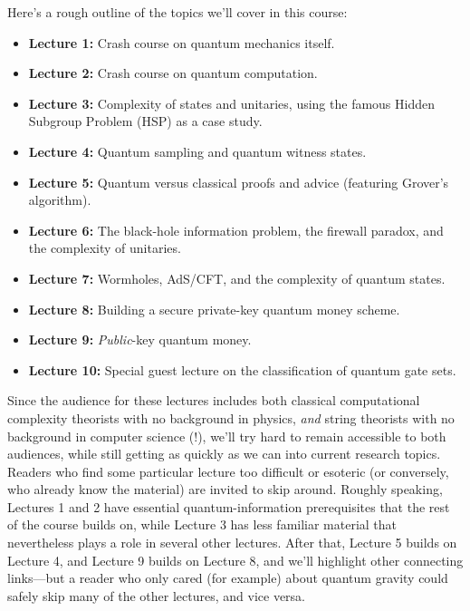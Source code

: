 \documentclass[12pt]{report}
\theoremstyle{plain}
\theoremstyle{definition}
\begin{document}
Here's a rough outline of the topics we'll cover in this course:
\begin{itemize}
    \item \textbf{Lecture 1:} Crash course on quantum mechanics itself.
    \item \textbf{Lecture 2:} Crash course on quantum computation.
    \item \textbf{Lecture 3:} Complexity of states and unitaries, using the famous Hidden Subgroup Problem (HSP) as a case study.
    \item \textbf{Lecture 4:} Quantum sampling and quantum witness states.
    \item \textbf{Lecture 5:} Quantum versus classical proofs and advice (featuring Grover's algorithm).
    \item \textbf{Lecture 6:} The black-hole information problem, the firewall paradox, and the complexity of unitaries.
    \item \textbf{Lecture 7:} Wormholes, AdS/CFT, and the complexity of quantum states.
    \item \textbf{Lecture 8:} Building a secure private-key quantum money scheme.
    \item \textbf{Lecture 9:} {\em Public}-key quantum money.
    \item \textbf{Lecture 10:} Special guest lecture on the classification of quantum gate sets.
\end{itemize}

Since the audience for these lectures includes both classical computational complexity theorists with no background in physics, {\em and} string theorists with no background in computer science (!), we'll try hard to remain accessible to both audiences, while still getting as quickly as we can into current research topics.  Readers who find some particular lecture too difficult or esoteric (or conversely, who already know the material) are invited to skip around.  Roughly speaking, Lectures 1 and 2 have essential quantum-information prerequisites that the rest of the course builds on, while Lecture 3 has less familiar material that nevertheless plays a role in several other lectures.  After that, Lecture 5 builds on Lecture 4, and Lecture 9 builds on Lecture 8, and we'll highlight other connecting links---but a reader who only cared (for example) about quantum gravity could safely skip many of the other lectures, and vice versa.
\end{document}
